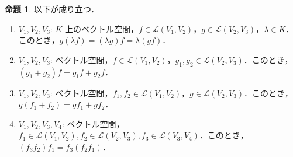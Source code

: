 \documentclass{jlreq}
\theoremstyle{definition}
\newtheorem{prop}[thm]{命題}
\begin{document}
      \begin{prop}
        以下が成り立つ．
        \begin{enumerate}
          \item $V_1,V_2,V_3$: $K$ 上のベクトル空間，$f \in \mathcal{L}(V_1,V_2)$，$g \in \mathcal{L}(V_2,V_3)$，$\lambda \in K$．このとき，$g(\lambda f)=(\lambda g)f=\lambda(gf)$．
          \item $V_1,V_2,V_3$: ベクトル空間，$f \in \mathcal{L}(V_1,V_2)$，$g_1, g_2 \in \mathcal{L}(V_2,V_3)$．このとき，$(g_1+g_2)f=g_1f+g_2f$．
          \item $V_1,V_2,V_3$: ベクトル空間，$f_1,f_2 \in \mathcal{L}(V_1,V_2)$，$g \in \mathcal{L}(V_2,V_3)$．このとき，$g(f_1+f_2)=gf_1+gf_2$．
          \item $V_1,V_2,V_3,V_4$: ベクトル空間，$f_1 \in \mathcal{L}(V_1,V_2), f_2 \in \mathcal{L}(V_2,V_3), f_3 \in \mathcal{L}(V_3,V_4)$．このとき，$(f_3f_2)f_1=f_3(f_2f_1)$．
        \end{enumerate}
      \end{prop}
\end{document}
